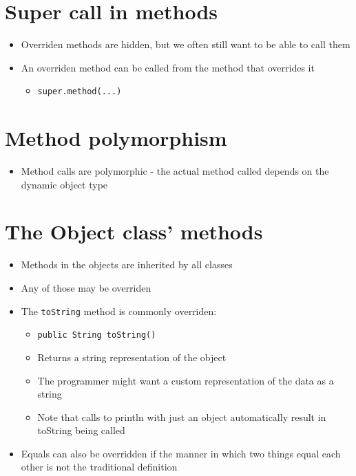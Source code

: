 \documentclass{article}[18pt]
\begin{document}
\section{Super call in methods}
\begin{itemize}
	\item Overriden methods are hidden, but we often still want to be able to call them
	\item An overriden method can be called from the method that overrides it
	\begin{itemize}
		\item \texttt{super.method(...)}
	\end{itemize}
\end{itemize}
\section{Method polymorphism}
\begin{itemize}
	\item Method calls are polymorphic - the actual method called depends on the dynamic object type
\end{itemize}
\section{The Object class' methods}
\begin{itemize}
	\item Methods in the objects are inherited by all classes
	\item Any of those may be overriden
	\item The \texttt{toString} method is commonly overriden:
	\begin{itemize}
		\item \texttt{public String toString()}
		\item Returns a string representation of the object
		\item The programmer might want a custom representation of the data as a string
		\item Note that calls to println with just an object automatically result in toString being called
	\end{itemize}
	\item Equals can also be overridden if the manner in which two things equal each other is not the traditional definition
\end{itemize}
\end{document}
